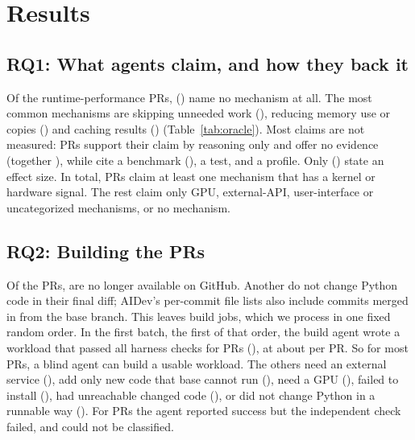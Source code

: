 \section{Results}
\label{sec:results}

\subsection{RQ1: What agents claim, and how they back it}
\label{sec:claims}
Of the \nClaims runtime-performance PRs, \nNoMech (\pctNoMech) name no
mechanism at all. The most common mechanisms are skipping unneeded work
(\mechSkipUnneededWork), reducing memory use or copies (\mechLessMemory)
and caching results (\mechCacheResults) (Table~\ref{tab:oracle}). Most
claims are not measured: \evReasoning PRs support their claim by reasoning
only and \evNone offer no evidence (together \pctReasonNone), while
\evBenchmark cite a benchmark (\pctBenchmark), \evTest a test, and
\evProfile a profile.
Only \nEffect (\pctEffect) state an effect size. In total, \nMeasurableClaims
PRs claim at least one mechanism that has a kernel or hardware signal. The
rest claim only GPU, external-API, user-interface or uncategorized
mechanisms, or no mechanism.

\subsection{RQ2: Building the PRs}
\label{sec:funnel}
Of the \nMeasurableClaims PRs, \nGhError are no longer available on GitHub.
Another \nNoPyFinal do not change Python code in their final diff; AIDev's
per-commit file lists also include commits merged in from the base
branch. This leaves \nJobs build jobs, which we process in one fixed
random order. In the first batch, the first \nAttempted of that order,
the build agent wrote a workload that passed all harness checks for
\funPassed PRs (\pctPassed), at about \usdPerBuild per PR. So for most
PRs, a blind agent can build a usable workload. The others need an
external service (\funNeedsExternalService), add only new code that base
cannot run (\funNewCodeOnly), need a GPU (\funNeedsGpu), failed to install
(\funInstallFailed), had unreachable changed code (\funChangeUnreachable),
or did not change Python in a runnable way (\funNotPythonChange). For
\funFailedCheck PRs the agent reported success but the independent check
failed, and \funOther could not be classified.


